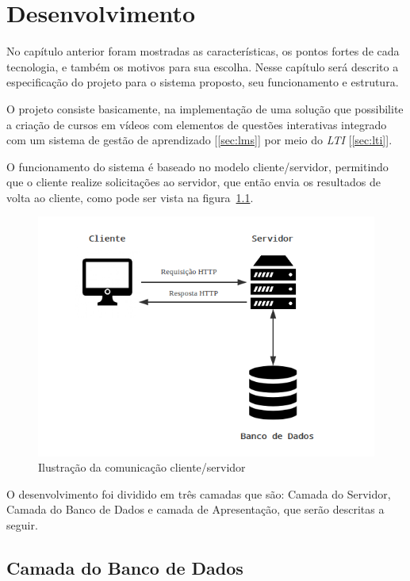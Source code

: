 \chapter{Desenvolvimento}

No capítulo anterior foram mostradas as características, os pontos fortes de cada tecnologia, e também os motivos para sua escolha. Nesse capítulo será descrito a especificação do projeto para o sistema proposto, seu funcionamento e estrutura.

O projeto consiste basicamente, na implementação de uma solução que possibilite a criação de cursos em vídeos com elementos de questões interativas integrado com um sistema de gestão de aprendizado [\autoref{sec:lms}] por meio do \textit{LTI} [\autoref{sec:lti}]. 

O funcionamento do sistema é baseado no modelo cliente/servidor, permitindo que o cliente realize solicitações ao servidor, que então envia os resultados de volta ao cliente, como pode ser vista na figura~\ref{fig:comunicacao-cliente-servidor}.

\begin{figure}[h]
    \centering
    \includegraphics[keepaspectratio=true,scale=0.7]{figuras/comunicacao_cliente_servidor.png}
    \caption{Ilustração da comunicação cliente/servidor}
    \label{fig:comunicacao-cliente-servidor}
\end{figure}

O desenvolvimento foi dividido em três camadas que são: Camada do Servidor, Camada do Banco de Dados e camada de Apresentação, que serão descritas a seguir.

\section{Camada do Banco de Dados}

